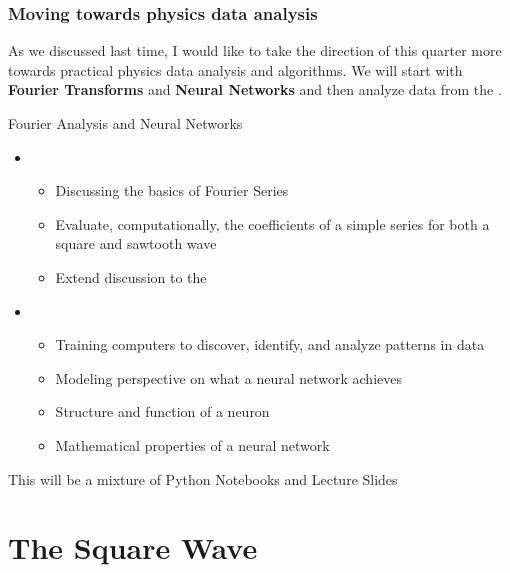 \documentclass[hyperref={colorlinks=true}]{beamer}
\begin{document}
\begin{frame}%
  \frametitle{Moving towards physics data analysis}

  As we discussed last time, I would like to take the direction of this quarter more towards practical physics data analysis and algorithms. We will start with \textbf{Fourier Transforms} and \textbf{Neural Networks} and then analyze data from the .
  
  \vspace{0.3cm}
  
  \begin{ucblock}{Fourier Analysis and Neural Networks}
    \begin{itemize}
      \item {} 
      \begin{itemize}
        \item Discussing the basics of Fourier Series 
        \item Evaluate, computationally, the coefficients of a simple series for both a square and sawtooth wave
        \item Extend discussion to the 
      \end{itemize}
      \item {} 
      \begin{itemize}
        \item Training computers to discover, identify, and analyze patterns in data 
        \item Modeling perspective on what a neural network achieves
        \item Structure and function of a neuron
        \item Mathematical properties of a neural network
      \end{itemize}
    \end{itemize}
  \end{ucblock}
  
  \mysp
  
  This will be a mixture of Python Notebooks and Lecture Slides

\end{frame}


\section[The Square Wave]{The Square Wave}
\end{document}
